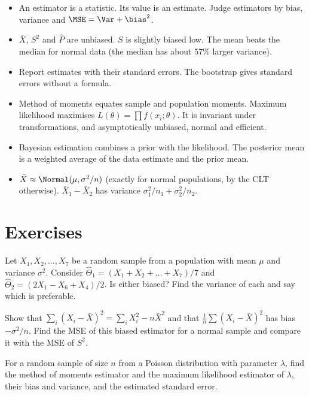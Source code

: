 \begin{summarybox}
\begin{itemize}
  \item An estimator is a statistic. Its value is an estimate. Judge estimators by bias, variance and $\MSE=\Var+\bias^2$.
  \item $\bar{X}$, $S^2$ and $\hat{P}$ are unbiased. $S$ is slightly biased low. The mean beats the median for normal data (the median has about $57\%$ larger variance).
  \item Report estimates with their standard errors. The bootstrap gives standard errors without a formula.
  \item Method of moments equates sample and population moments. Maximum likelihood maximises $L(\theta)=\prod f(x_i;\theta)$. It is invariant under transformations, and asymptotically unbiased, normal and efficient.
  \item Bayesian estimation combines a prior with the likelihood. The posterior mean is a weighted average of the data estimate and the prior mean.
  \item $\bar{X}\approx\Normal(\mu,\sigma^2/n)$ (exactly for normal populations, by the CLT otherwise). $\bar{X}_1-\bar{X}_2$ has variance $\sigma_1^2/n_1+\sigma_2^2/n_2$.
\end{itemize}
\end{summarybox}

\section{Exercises}

\begin{exercise}
Let $X_1,X_2,\dots,X_7$ be a random sample from a population with mean $\mu$ and variance $\sigma^2$. Consider $\hat\Theta_1=(X_1+X_2+\dots+X_7)/7$ and $\hat\Theta_2=(2X_1-X_6+X_4)/2$. Is either biased? Find the variance of each and say which is preferable.
\end{exercise}

\begin{exercise}
Show that $\sum_{i}(X_i-\bar{X})^2=\sum_i X_i^2-n\bar{X}^2$ and that $\frac1n\sum(X_i-\bar{X})^2$ has bias $-\sigma^2/n$. Find the MSE of this biased estimator for a normal sample and compare it with the MSE of $S^2$.
\end{exercise}

\begin{exercise}
For a random sample of size $n$ from a Poisson distribution with parameter $\lambda$, find the method of moments estimator and the maximum likelihood estimator of $\lambda$, their bias and variance, and the estimated standard error.
\end{exercise}

